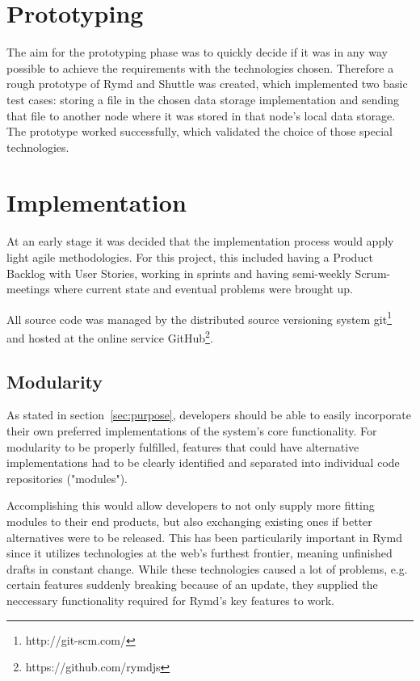 \section{Prototyping}

The aim for the prototyping phase was to quickly decide if it was in any way possible to achieve the requirements with the technologies chosen. Therefore a rough prototype of Rymd and Shuttle was created, which implemented two basic test cases: storing a file in the chosen data storage implementation and sending that file to another node where it was stored in that node's local data storage. The prototype worked successfully, which validated the choice of those special technologies.

\section{Implementation}

At an early stage it was decided that the implementation process would apply light agile methodologies. For this project, this included having a Product Backlog with User Stories, working in sprints and having semi-weekly Scrum-meetings where current state and eventual problems were brought up.

All source code was managed by the distributed source versioning system git\footnote{http://git-scm.com/} and hosted at the online service GitHub\footnote{https://github.com/rymdjs}.

\subsection{Modularity}

As stated in section~\ref{sec:purpose}, developers should be able to easily incorporate their own preferred implementations of the system's core functionality. For modularity to be properly fulfilled, features that could have alternative implementations had to be clearly identified and separated into individual code repositories ("modules").

Accomplishing this would allow developers to not only supply more fitting modules to their end products, but also exchanging existing ones if better alternatives were to be released. This has been particularily important in Rymd since it utilizes technologies at the web's furthest frontier, meaning unfinished drafts in constant change. While these technologies caused a lot of problems, e.g. certain features suddenly breaking because of an update, they supplied the neccessary functionality required for Rymd's key features to work.
